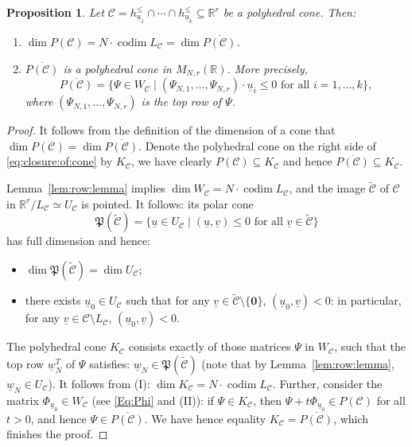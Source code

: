 \documentclass[12pt, a4article]{amsart}   	%
\numberwithin{equation}{section}
\theoremstyle{plain}
\newtheorem{proposition}[theorem]{Proposition}
\theoremstyle{definition}
\newcommand{\R}{{\mathbb R}}
\newcommand{\mcC}{{\mathcal C}}
\newcommand{\uu}{{\underline u}}
\newcommand{\uv}{{\underline v}}
\newcommand{\uw}{{\underline w}}
\DeclareMathOperator{\codim}{codim}
\begin{document}
\begin{proposition}\label{prp:polar:dimension}
Let $\mcC=h_{ {\uu_1}}^\leq\cap \cdots\cap h_{ {\uu_k}}^\leq \subseteq\R^r$ be a polyhedral cone. Then:  
\begin{enumerate} 
\item[\rm (i)] $\dim P(\mcC) = N\cdot \codim L_\mcC=\dim \overline{P(\mcC)}$.
\item[\rm (ii)] $\overline{P(\mcC)}$ is a polyhedral cone in $M_{N,r}(\R)$. More precisely,
\begin{equation}\label{eq:closure:of:cone}
\overline{P(\mcC)}=\{\Psi\in W_\mcC\mid (\Psi_{N,1},\ldots,
\Psi_{N,r})\cdot\underline{u}_i\le 0 \text{ for all } i=1,\ldots,k\},
\end{equation} 
where $ (\Psi_{N,1},\ldots,\Psi_{N,r})$ is the top row of $\Psi$.
\end{enumerate}
\end{proposition}
\begin{proof}
It follows from the definition of the dimension of a cone that $\dim P(\mcC)=\dim \overline{P(\mcC)}$.
Denote the polyhedral cone on the right side of \eqref{eq:closure:of:cone} by $K_\mcC$,
we have clearly $P(\mcC)\subseteq K_\mcC$ and hence $ \overline{P(\mcC)}\subseteq K_\mcC$.

Lemma~\ref{lem:row:lemma} implies $\dim W_\mcC=N\cdot \codim L_\mcC$, and the image $\widetilde{\mcC}$ of $\mcC$ in $\mathbb R^r/L_\mcC\simeq U_\mcC$ is 
pointed. It follows: its polar cone
$$\mathfrak{P}(\widetilde{\mcC})=\{\uu\in U_\mcC\mid (\uu, \uv)\le 0 \text{ for all } \uv \in \widetilde{\mcC}\}$$
has full dimension and hence: 
\begin{itemize}
\item[\rm (I)] $\dim \mathfrak{P}(\widetilde{\mcC})=\dim U_\mcC$; 
\item[\rm (II)] there exists $\uu_0\in U_\mcC$ such that for any $\uv \in \widetilde{\mcC}\setminus\{\mathbf 0\}$, $(\uu_0, \uv) < 0$: in particular, for any $\uv \in \mcC\setminus L_\mcC$, $(\uu_0, \uv) < 0$.
\end{itemize}

The polyhedral cone $K_\mcC$ consists exactly of those matrices $\Psi$ in $W_\mcC$, such that the top row $\uw^T_N$ of $\Psi$ satisfies: $\uw_N\in \mathfrak{P}(\widetilde{\mcC})$ (note that by Lemma~\ref{lem:row:lemma}, $\underline{w}_N\in U_{\mathcal{C}}$). It follows from (I): $\dim K_\mcC=N\cdot \codim L_\mcC$. Further, consider the matrix $\Phi_{\uu_0}\in W_\mcC$ (see \eqref{Eq:Phi}  and (II)): if $\Psi\in K_\mcC$, then $\Psi+t\Phi_{\uu_0}\in P(\mcC)$ for all $t>0$, and hence $\Psi\in \overline{P(\mcC)}$. We have hence equality $K_\mcC=\overline{P(\mcC)}$, which finishes the proof.
\end{proof}
\end{document}
